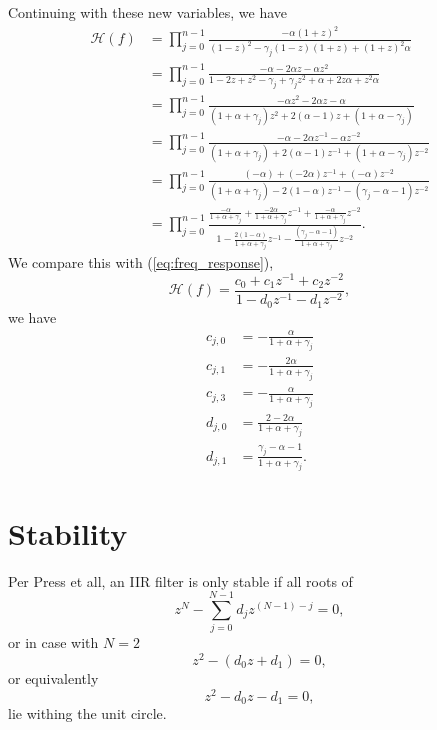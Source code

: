 \documentclass[a4paper]{article}
\begin{document}
Continuing with these new variables, we have
\begin{align}
    \mathcal{H}(f) &= \prod_{j=0}^{n - 1}\frac{-\alpha (1 + z)^2}
        {(1 - z)^2 - \gamma_j (1 - z)(1 + z) + (1 + z)^2 \alpha} \\
    &= \prod_{j=0}^{n - 1}\frac{-\alpha  - 2\alpha z - \alpha z^2}
        {1 - 2z + z^2 - \gamma_j + \gamma_j z^2 + \alpha + 2z \alpha + z^2 \alpha} \\
    &= \prod_{j=0}^{n - 1}\frac{-\alpha z^2 - 2\alpha z - \alpha }
        {(1 + \alpha + \gamma_j)z^2 + 2(\alpha - 1) z + (1 + \alpha - \gamma_j)} \\
    &= \prod_{j=0}^{n - 1}\frac{-\alpha  - 2\alpha  z^{-1} - \alpha  z^{-2}}
        {(1 + \alpha + \gamma_j) + 2(\alpha - 1) z^{-1} + (1 + \alpha - \gamma_j) z^{-2}} \\
    &= \prod_{j=0}^{n - 1}\frac{(-\alpha ) + (-2\alpha ) z^{-1} + (-\alpha )z^{-2}}
        {(1 + \alpha + \gamma_j) - 2(1 - \alpha) z^{-1} - (\gamma_j - \alpha - 1)z^{-2}}\\
    &= \prod_{j=0}^{n - 1}\frac{\frac{-\alpha }{1 + \alpha + \gamma_j} + \frac{-2 \alpha }{1 + \alpha + \gamma_j}z^{-1} + \frac{-\alpha }{1 + \alpha + \gamma_j}z^{-2}}
        {1 - \frac{2(1 - \alpha)}{1 + \alpha + \gamma_j} z^{-1} - \frac{(\gamma_j - \alpha - 1)}{1 + \alpha + \gamma_j}z^{-2}}.
\end{align}
We compare this with (\ref{eq:freq_response}),
\begin{equation*}
\mathcal{H}(f) = \frac{c_0 + c_1 z^{-1} + c_2 z^{-2}}{1 - d_0 z^{-1} - d_1 z^{-2}},
\end{equation*}
we have
\begin{align}
    c_{j,0} &= -\frac{\alpha }{1 + \alpha + \gamma_j} \\
    c_{j,1} &= -\frac{2 \alpha }{1 + \alpha + \gamma_j} \\
    c_{j,3} &= -\frac{\alpha }{1 + \alpha + \gamma_j} \\
    d_{j,0} &= \frac{2-2\alpha}{1 + \alpha + \gamma_j} \\
    d_{j,1} &= \frac{\gamma_j - \alpha - 1}{1 + \alpha + \gamma_j}.
\end{align}


\section{Stability}
Per Press et all, an IIR filter is only stable if all roots of
\begin{equation}
z^N - \sum^{N-1}_{j=0} d_j z^{(N-1)-j} = 0,\label{eq:stability}
\end{equation}
or in case with $N=2$
\begin{equation}
z^2 - (d_0 z + d_1) = 0,
\end{equation}
or equivalently
\begin{equation}
z^2 - d_0 z - d_1 = 0,
\end{equation}
lie withing the unit circle.
\end{document}
